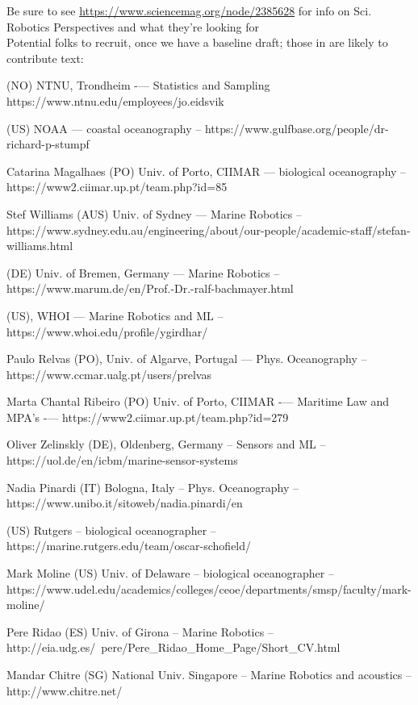\newpage
\large{Be sure to see \url{https://www.sciencemag.org/node/2385628}
  for info on
  Sci. Robotics Perspectives and what they're looking for}\\


Potential folks to recruit, once we have a baseline draft; those in
 are likely to contribute text:

\begin{enumerate}[noitemsep,topsep=0pt,parsep=0pt,partopsep=0pt]
\footnotesize{  
\item {} (NO) NTNU, Trondheim -— Statistics and Sampling https://www.ntnu.edu/employees/jo.eidsvik
\item {} (US) NOAA — coastal oceanography -- https://www.gulfbase.org/people/dr-richard-p-stumpf
\item Catarina Magalhaes (PO) Univ. of Porto, CIIMAR — biological oceanography -- https://www2.ciimar.up.pt/team.php?id=85
\item Stef Williams (AUS) Univ. of Sydney — Marine Robotics -- https://www.sydney.edu.au/engineering/about/our-people/academic-staff/stefan-williams.html
\item {} (DE) Univ. of Bremen, Germany — Marine Robotics -- https://www.marum.de/en/Prof.-Dr.-ralf-bachmayer.html
\item {} (US), WHOI — Marine Robotics and ML -- https://www.whoi.edu/profile/ygirdhar/
\item Paulo Relvas (PO), Univ. of Algarve, Portugal — Phys. Oceanography -- https://www.ccmar.ualg.pt/users/prelvas
\item Marta Chantal Ribeiro (PO) Univ. of Porto, CIIMAR -— Maritime Law and MPA’s -— https://www2.ciimar.up.pt/team.php?id=279
\item Oliver Zelinskly (DE), Oldenberg, Germany -- Sensors and ML -- https://uol.de/en/icbm/marine-sensor-systems
\item Nadia Pinardi (IT) Bologna, Italy -- Phys. Oceanography -- https://www.unibo.it/sitoweb/nadia.pinardi/en
\item {} (US) Rutgers -- biological oceanographer -- https://marine.rutgers.edu/team/oscar-schofield/  
\item Mark Moline (US) Univ. of Delaware -- biological oceanographer -- https://www.udel.edu/academics/colleges/ceoe/departments/smsp/faculty/mark-moline/
\item Pere Ridao (ES) Univ. of Girona -- Marine Robotics -- http://eia.udg.es/~pere/Pere\_Ridao\_Home\_Page/Short\_CV.html
\item Mandar Chitre (SG) National Univ. Singapore -- Marine Robotics
  and acoustics -- http://www.chitre.net/

}
\end{enumerate}
